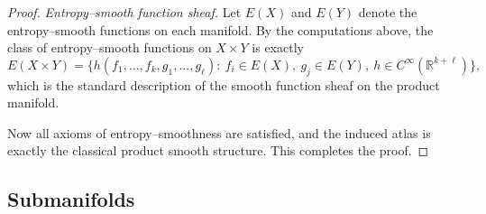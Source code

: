 \documentclass[11pt]{amsart}
\theoremstyle{definition}
\theoremstyle{remark}
\begin{document}
\begin{proof}
\medskip

\emph{Entropy–smooth function sheaf.}
Let $E(X)$ and $E(Y)$ denote the entropy–smooth functions on each manifold.
By the computations above, the class of entropy–smooth functions on $X\times Y$ is exactly
\[
E(X\times Y)=
\big\{
h(f_1,\dots,f_k,g_1,\dots,g_\ell)
:\ f_i\in E(X),\ g_j\in E(Y),\ h\in C^\infty(\mathbb{R}^{k+\ell})
\big\},
\]
which is the standard description of the smooth function sheaf on the product manifold.

Now all axioms of entropy–smoothness are satisfied, and the induced atlas is exactly the classical product smooth structure. This completes the proof.
\end{proof}



\subsection{Submanifolds}
\end{document}

